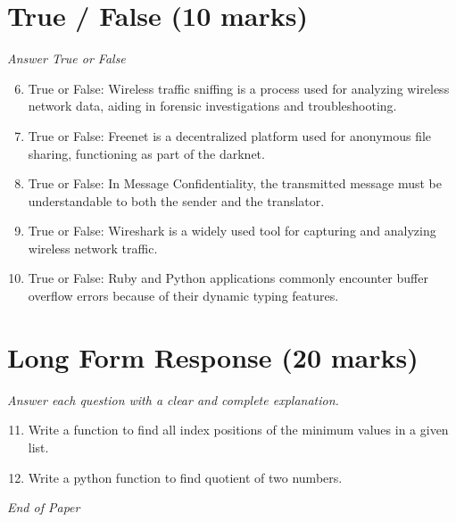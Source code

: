 \documentclass[12pt]{article}
\begin{document}
\section*{True / False (10 marks)}
\textit{Answer True or False}
\begin{enumerate}[label=\arabic*.]
\setcounter{enumi}{5}
\item True or False: Wireless traffic sniffing is a process used for analyzing wireless network data, aiding in forensic investigations and troubleshooting.
\item True or False: Freenet is a decentralized platform used for anonymous file sharing, functioning as part of the darknet.
\item True or False: In Message Confidentiality, the transmitted message must be understandable to both the sender and the translator.
\item True or False: Wireshark is a widely used tool for capturing and analyzing wireless network traffic.
\item True or False: Ruby and Python applications commonly encounter buffer overflow errors because of their dynamic typing features.
\end{enumerate}

\section*{Long Form Response (20 marks)}
\textit{Answer each question with a clear and complete explanation.}
\begin{enumerate}[label=\arabic*.]
\setcounter{enumi}{10}
\item Write a function to find all index positions of the minimum values in a given list.
\item Write a python function to find quotient of two numbers.
\end{enumerate}

\vfill
\noindent\textit{End of Paper}
\end{document}
